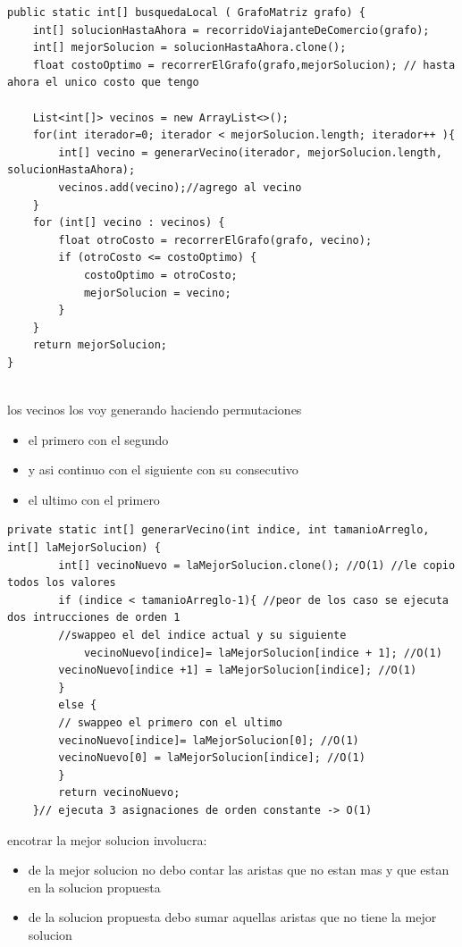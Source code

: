 \documentclass[a4paper,11pt]{article}
\begin{document}
\lstset{language=Java, breaklines=true, basicstyle=\footnotesize}
\begin{lstlisting}[frame=single]
public static int[] busquedaLocal ( GrafoMatriz grafo) {
	int[] solucionHastaAhora = recorridoViajanteDeComercio(grafo);
	int[] mejorSolucion = solucionHastaAhora.clone();
	float costoOptimo = recorrerElGrafo(grafo,mejorSolucion); // hasta ahora el unico costo que tengo

	List<int[]> vecinos = new ArrayList<>();
	for(int iterador=0; iterador < mejorSolucion.length; iterador++ ){
		int[] vecino = generarVecino(iterador, mejorSolucion.length, solucionHastaAhora);
		vecinos.add(vecino);//agrego al vecino
	}
	for (int[] vecino : vecinos) {
		float otroCosto = recorrerElGrafo(grafo, vecino);
		if (otroCosto <= costoOptimo) {
			costoOptimo = otroCosto;
			mejorSolucion = vecino;
		}
	}
	return mejorSolucion;
}
	

\end{lstlisting}
los vecinos los voy generando haciendo permutaciones
\begin{itemize}
  \item el primero con el segundo
  \item y asi continuo con el siguiente con su consecutivo
  \item el ultimo con el primero 
\end{itemize}
\lstset{language=Java, breaklines=true, basicstyle=\footnotesize}
\begin{lstlisting}[frame=single]
    private static int[] generarVecino(int indice, int tamanioArreglo, int[] laMejorSolucion) {
		int[] vecinoNuevo = laMejorSolucion.clone(); //O(1) //le copio todos los valores
		if (indice < tamanioArreglo-1){ //peor de los caso se ejecuta dos intrucciones de orden 1
		//swappeo el del indice actual y su siguiente
			vecinoNuevo[indice]= laMejorSolucion[indice + 1]; //O(1)
		vecinoNuevo[indice +1] = laMejorSolucion[indice]; //O(1)
		}
		else {
		// swappeo el primero con el ultimo
		vecinoNuevo[indice]= laMejorSolucion[0]; //O(1)
		vecinoNuevo[0] = laMejorSolucion[indice]; //O(1)
		}
		return vecinoNuevo;
	}// ejecuta 3 asignaciones de orden constante -> O(1)
\end{lstlisting}


encotrar la mejor solucion involucra:
\begin{itemize}
  \item de la mejor solucion no debo contar las aristas que no estan mas y que estan en la solucion propuesta
  \item de la solucion propuesta debo sumar aquellas aristas que no tiene la mejor solucion
  
  
\end{itemize}
\end{document}
